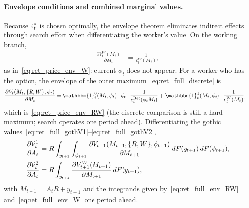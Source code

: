 \paragraph{Envelope conditions and combined marginal values.}
Because $\varepsilon_t^{\ast}$ is chosen optimally, the envelope theorem eliminates indirect effects through search effort when differentiating the worker's value. On the working branch,
\begin{align}
	\frac{\partial V_t^{W}(M_t)}{\partial M_t}
	&= \frac{1}{c_t^{W}(M_t)},
	\label{eq:ret_full_env_W}
\end{align}
as in~\eqref{eq:ret_price_env_W}: current $\phi_t$ does not appear. For a worker who has the option, the envelope of the outer maximum~\eqref{eq:ret_full_discrete} is
\begin{align}
	\frac{\partial V_t(M_t,\{R,W\},\phi_t)}{\partial M_t}
	&= \mathbbm{1}_t^{0}(M_t,\phi_t)\cdot\phi_t\cdot\frac{1}{c_t^{\Ret}(\phi_t M_t)}
	+\mathbbm{1}_t^{1}(M_t,\phi_t)\cdot\frac{1}{c_t^{W}(M_t)},
	\label{eq:ret_full_env_RW}
\end{align}
which is~\eqref{eq:ret_price_env_RW} (the discrete comparison is still a hard maximum; search operates one period ahead). Differentiating the gothic values~\eqref{eq:ret_full_gothV1}--\eqref{eq:ret_full_gothV2},
\begin{align}
	\frac{\partial\mathcal{V}_t^{1}}{\partial A_t}
	&= R\int_{y_{t+1}}\int_{\phi_{t+1}}
	\frac{\partial V_{t+1}(M_{t+1},\{R,W\},\phi_{t+1})}{\partial M_{t+1}}
	\,dF(y_{t+1})\,dF(\phi_{t+1}),
	\label{eq:ret_full_dV1}\\
	\frac{\partial\mathcal{V}_t^{2}}{\partial A_t}
	&= R\int_{y_{t+1}}
	\frac{\partial V_{t+1}^{W}(M_{t+1})}{\partial M_{t+1}}
	\,dF(y_{t+1}),
	\label{eq:ret_full_dV2}
\end{align}
with $M_{t+1}=A_t R+y_{t+1}$ and the integrands given by~\eqref{eq:ret_full_env_RW} and~\eqref{eq:ret_full_env_W} one period ahead.


